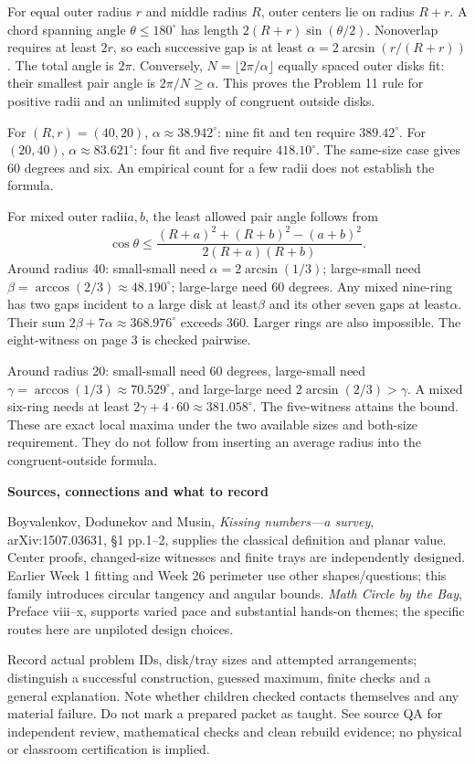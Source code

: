 \documentclass[11pt]{article}
\newcommand{\heading}[1]{\par\textbf{#1}\par}
\begin{document}
For equal outer radius $r$ and middle radius $R$, outer centers lie on radius $R+r$. A chord spanning angle $\theta\le 180^\circ$ has length $2(R+r)\sin(\theta/2)$. Nonoverlap requires at least $2r$, so each successive gap is at least $\alpha=2\arcsin(r/(R+r))$. The total angle is $2\pi$. Conversely, $N=\lfloor 2\pi/\alpha\rfloor$ equally spaced outer disks fit: their smallest pair angle is $2\pi/N\ge\alpha$. This proves the Problem 11 rule for positive radii and an unlimited supply of congruent outside disks.

For $(R,r)=(40,20)$, $\alpha\approx 38.942^\circ$: nine fit and ten require $389.42^\circ$. For$(20,40)$, $\alpha\approx 83.621^\circ$: four fit and five require $418.10^\circ$. The same-size case gives 60 degrees and six. An empirical count for a few radii does not establish the formula.

For mixed outer radii$a,b$, the least allowed pair angle follows from
\[
\cos\theta\le\frac{(R+a)^2+(R+b)^2-(a+b)^2}{2(R+a)(R+b)}.
\]
Around radius 40: small-small need $\alpha=2\arcsin(1/3)$; large-small need $\beta=\arccos(2/3)\approx 48.190^\circ$; large-large need 60 degrees. Any mixed nine-ring has two gaps incident to a large disk at least$\beta$ and its other seven gaps at least$\alpha$. Their sum $2\beta+7\alpha\approx 368.976^\circ$ exceeds 360. Larger rings are also impossible. The eight-witness on page 3 is checked pairwise.

Around radius 20: small-small need 60 degrees, large-small need $\gamma=\arccos(1/3)\approx 70.529^\circ$, and large-large need $2\arcsin(2/3)>\gamma$. A mixed six-ring needs at least $2\gamma+4\cdot 60\approx 381.058^\circ$. The five-witness attains the bound. These are exact local maxima under the two available sizes and both-size requirement. They do not follow from inserting an average radius into the congruent-outside formula.

\heading{Sources, connections and what to record}
Boyvalenkov, Dodunekov and Musin, \emph{Kissing numbers---a survey}, arXiv:1507.03631, \S1 pp.1--2, supplies the classical definition and planar value. Center proofs, changed-size witnesses and finite trays are independently designed. Earlier Week 1 fitting and Week 26 perimeter use other shapes/questions; this family introduces circular tangency and angular bounds. \emph{Math Circle by the Bay}, Preface viii--x, supports varied pace and substantial hands-on themes; the specific routes here are unpiloted design choices.

Record actual problem IDs, disk/tray sizes and attempted arrangements; distinguish a successful construction, guessed maximum, finite checks and a general explanation. Note whether children checked contacts themselves and any material failure. Do not mark a prepared packet as taught. See source QA for independent review, mathematical checks and clean rebuild evidence; no physical or classroom certification is implied.
\end{document}
